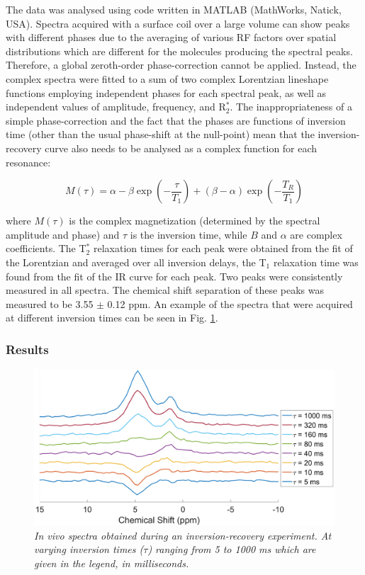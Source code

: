 The data was analysed using code written in MATLAB (MathWorks, Natick, USA). Spectra acquired with a surface coil over a large volume can show peaks with different phases due to the averaging of various \ac{RF} factors over spatial distributions which are different for the molecules producing the spectral peaks. Therefore, a global zeroth-order phase-correction cannot be applied. Instead, the complex spectra were fitted to a sum of two complex Lorentzian lineshape functions employing independent phases for each spectral peak, as well as independent values of amplitude, frequency, and R$_2^*$. The inappropriateness of a simple phase-correction and the fact that the phases are functions of inversion time (other than the usual phase-shift at the null-point) mean that the inversion-recovery curve also needs to be analysed as a complex function for each resonance:

\begin{equation}
    M(\tau) = \alpha - \beta\exp(-\frac{\tau}{T_1}) + (\beta - \alpha)\exp(-\frac{T_R}{T_1})
    \label{eqn:Lip:IR}
\end{equation}

where $M(\tau)$ is the complex magnetization (determined by the spectral amplitude and phase) and $\tau$ is the inversion time, while $B$ and $\alpha$ are complex coefficients. The T$_2^*$ relaxation times for each peak were obtained from the fit of the Lorentzian and averaged over all inversion delays, the T$_1$ relaxation time was found from the fit of the \ac{IR} curve for each peak. Two peaks were consistently measured in all spectra. The chemical shift separation of these peaks was measured to be 3.55 $\pm$ 0.12 ppm. An example of the spectra that were acquired at different inversion times can be seen in Fig. \ref{fig:Lip:IR}.

\subsubsection{Results}

\begin{figure}
    \centering
    \includegraphics[width=1\textwidth]{Figures/Lipid/NA_IR.png}
    \caption{\textit{\textit{In vivo} spectra obtained during an inversion-recovery experiment. At varying inversion times ($\tau$) ranging from 5 to 1000 ms which are given in the legend, in milliseconds.}}
    \label{fig:Lip:IR}
\end{figure}

